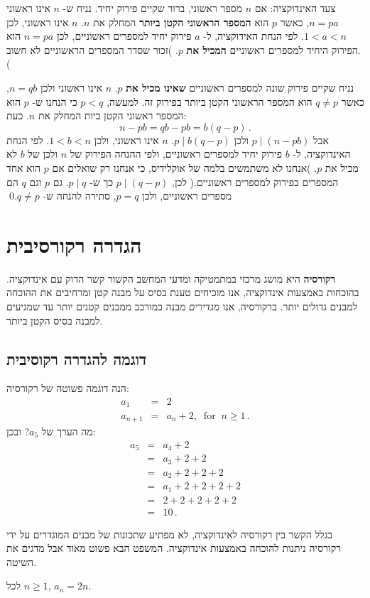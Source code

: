 צעד האינדוקציה: אם
$n$
מספר ראשוני, ברור שקיים פירוק יחיד. נניח ש-%
$n$
אינו ראשוני
$n=pa$,
כאשר
$p$
הוא
\textbf{המספר הראשוני הקטן ביותר}
המחלק את
$n$.
$n$
אינו ראשוני, לכן
$1<a<n$.
לפי הנחת האידוקציה, ל-%
$a$
פירוק יחיד למספרים ראשוניים, לכן
$n=pa$
הוא הפירוק היחיד למספרים ראשוניים
\textbf{המכיל את}
$p$.
)זכור שסדר המספרים הראשוניים לא חשוב.(

נניח שקיים פירוק שונה למספרים ראשוניים
\textbf{שאינו מכיל את}
$p$.
$n$
אינו ראשוני ולכן
$n=qb$,
כאשר
$q\neq p$
הוא המספר הראשוני הקטן ביותר בפירוק זה. למעשה, 
$p<q$
כי הנחנו ש-%
$p$
הוא המספר ראשוני הקטן ביות המחלק את
$n$.
כעת:
\[
n - pb = qb - pb = b(q-p)\,.
\]
אבל
$p\mid (n-pb)$
ולכן
$p\mid b(q-p)$.
$n$
אינו ראשוני, ולכן
$1<b<n$.
לפי הנחת האינדוקציה, ל-%
$b$
פירוק יחיד למספרים ראשוניים, ולפי ההנחה הפירוק של
$n$
ולכן של
$b$
לא מכיל את
$p$.
)אנחנו לא משתמשים בלמה של אוקלידיס, כי אנחנו רק שואלים אם
$p$
הוא אחד המספרים בפירוק למספרים ראשוניים.( לכן,
$p\mid(q-p)$
כך ש-%
$p\mid q$.
גם
$p$
וגם
$q$
הם מספרים ראשוניים, ולכן
$p=q$,
סתירה להנחה ש-%
$q\neq p$.\qed

\section{%
הגדרה רקורסיבית%
}

\textbf{רקורסיה}
היא מושג מרכזי במתמטיקה ומדעי המחשב הקשור קשר הדוק עם אינדוקציה. בהוכחות באמצעות אינדוקציה, אנו מוכיחים טענת בסיס על מבנה קטן ומרחיבים את ההוכחה למבנים גדולים יותר. ברקורסיה, אנו
\emph{מגדירים}
מבנה כמורכב ממבנים קטנים יותר עד שמגיעים למבנה בסיס הקטן ביותר.

\subsection*{%
דוגמה להגדרה רקוסיבית%
}

הנה דוגמה פשוטה של רקורסיה:
\begin{eqnarray*}
a_1 &=& 2\\
a_{n+1} &=& a_n + 2, \;\;\textrm{for}\;\; n\geq 1\,.
\end{eqnarray*}
מה הערך של
$a_5$?
ובכן:
\begin{eqnarray*}
a_5 &=& a_4 + 2\\
&=& a_3+2+2\\
&=& a_2+2+2+2\\
&=& a_1+2+2+2+2\\
&=& 2+2+2+2+2\\
&=&10\,.
\end{eqnarray*}

בגלל הקשר בין רקורסיה לאינדוקציה, לא מפתיע שתכונות של מבנים המוגדרים על ידי רקורסיה ניתנות להוכחה באמצעות אינדוקציה. המשפט הבא פשוט מאוד אבל מדגים את השיטה.
\begin{theorem}\label{t.recursive}
לכל
$n\geq 1$, $a_n = 2n$.
\end{theorem}

